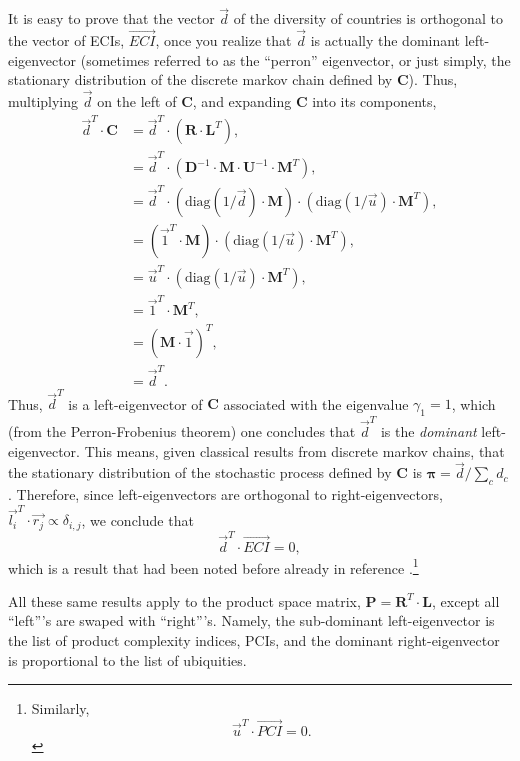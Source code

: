\documentclass[12pt]{article}
\newcommand{\mtx}[1]{\mathbf{ #1}}
\newcommand{\diag}[1]{\mathrm{diag}\left( #1\right)}
\begin{document}
It is easy to prove that the vector $\vec{d}$ of the diversity of countries is orthogonal to the vector of ECIs, $\vec{ECI}$, once you realize that $\vec{d}$ is actually the dominant left-eigenvector (sometimes referred to as the ``perron'' eigenvector, or just simply, the stationary distribution of the discrete markov chain defined by $\mtx{C}$). Thus, multiplying $\vec{d}$ on the left of $\mtx{C}$, and expanding $\mtx{C}$ into its components,
\begin{align}
    \vec{d}^T\cdot\mtx{C} &= \vec{d}^T\cdot(\mtx{R}\cdot\mtx{L}^T), \nonumber \\
    &= \vec{d}^T\cdot(\mtx{D}^{-1}\cdot\mtx{M}\cdot\mtx{U}^{-1}\cdot\mtx{M}^T), \nonumber \\
    &= \vec{d}^T\cdot(\diag{1/\vec{d}}\cdot \mtx{M})\cdot(\diag{1/\vec{u}}\cdot\mtx{M}^T), \nonumber \\
    &= (\vec{1}^T\cdot\mtx{M})\cdot(\diag{1/\vec{u}}\cdot\mtx{M}^T), \nonumber \\
    &= \vec{u}^T\cdot(\diag{1/\vec{u}}\cdot\mtx{M}^T), \nonumber \\
    &= \vec{1}^T\cdot\mtx{M}^T, \nonumber \\
		&= (\mtx{M}\cdot\vec{1})^T, \nonumber\\
    &= \vec{d}^T.
\end{align}
Thus, $\vec{d}^T$ is a left-eigenvector of $\mtx{C}$ associated with the eigenvalue $\gamma_1=1$, which (from the Perron-Frobenius theorem) one concludes that $\vec{d}^T$ is the \emph{dominant} left-eigenvector. This means, given classical results from discrete markov chains, that the stationary distribution of the stochastic process defined by $\mtx{C}$ is ${\boldsymbol \pi} = \vec{d}/\sum_c d_c$. Therefore, since left-eigenvectors are orthogonal to right-eigenvectors, $\vec{l_i}^T \cdot \vec{r_j}\propto\delta_{i,j}$, we conclude that $$\vec{d}^T\cdot\vec{ECI}=0,$$ which is a result that had been noted before already in reference \citep{kemp2014interpretation}.\footnote{Similarly, $$\vec{u}^T\cdot\vec{PCI}=0.$$}

All these same results apply to the product space matrix, $\mtx{P} = \mtx{R}^T\cdot \mtx{L}$, except all ``left'''s are swaped with ``right'''s. Namely, the sub-dominant left-eigenvector is the list of product complexity indices, PCIs, and the dominant right-eigenvector is proportional to the list of ubiquities.
\end{document}
